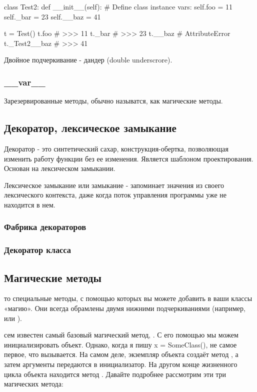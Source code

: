 \begin{python}
class Test2:
    def __init__(self):
        # Define class instance vars:
        self.foo = 11 
        self._bar = 23
        self.__baz = 41

t = Test()
t.foo
# >>> 11
t._bar
# >>> 23
t.__baz
# AttributeError
t._Test2__baz
# >>> 41
\end{python}

Двойное подчеркивание - дандер (double underscrore).

\subsubsection{\_\_var\_\_}

Зарезервированные методы, обычно называтся, как магические методы.

\subsection{Декоратор, лексическое замыкание}

Декоратор - это синтетический сахар, конструкция-обертка, позволяющая изменить работу функции без ее изменения. Является шаблоном проектирования. Основан на лексическом замыкании.

Лексическое замыкание или замыкание - запоминает значения из своего лексического контекста, даже когда поток управления программы уже не находится в нем. 

\subsubsection{Фабрика декораторов}

\subsubsection{Декоратор класса}

\subsection{Магические методы}	

то специальные методы, с помощью которых вы можете добавить в ваши классы «магию». Они всегда обрамлены двумя нижними подчеркиваниями (например,  или ). 

сем известен самый базовый магический метод, . С его помощью мы можем инициализировать объект. Однако, когда я пишу x = SomeClass(),  не самое первое, что вызывается. На самом деле, экземпляр объекта создаёт метод , а затем аргументы передаются в инициализатор. На другом конце жизненного цикла объекта находится метод . Давайте подробнее рассмотрим эти три магических метода:

